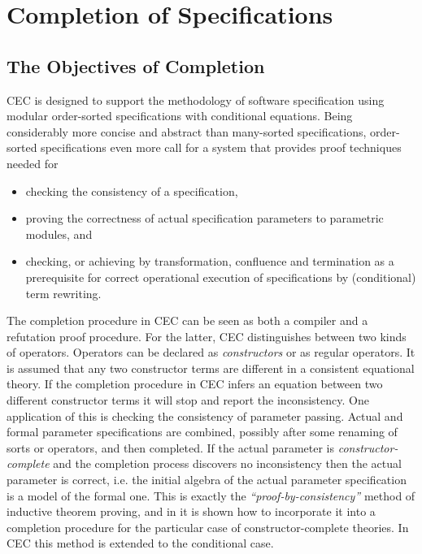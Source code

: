 \section{Completion of Specifications}

\subsection{The Objectives of Completion}

CEC is designed to support the methodology of software specification 
using modular order-sorted specifications with conditional equations.
Being considerably more concise and abstract than many-sorted specifications,
order-sorted specifications even more call for a system that provides
proof techniques needed for
\begin{itemize}
\item checking the consistency of a specification,
\item proving the correctness of actual specification parameters to
parametric modules, and
\item checking, or achieving by transformation, confluence and termination
as a prerequisite
for correct operational execution of specifications by (conditional)
term rewriting.
\end{itemize}
The completion procedure in CEC can be seen as both a compiler and a refutation
proof procedure.
For the latter, CEC distinguishes between two kinds of operators.
Operators can be declared
as {\em constructors} or as regular operators.
It is assumed that any two constructor terms
are different in a consistent equational theory.
If the completion procedure in CEC infers an equation between two
different constructor terms it will stop and report the inconsistency.
One application of this is checking the consistency of parameter passing.
Actual and formal parameter specifications are combined, possibly after
some renaming of sorts or operators, and then completed.
If the actual parameter is {\em constructor-complete} and the completion
process 
discovers no inconsistency then the actual parameter is correct, i.e.
the initial algebra of the actual parameter specification is a model of the
formal one.
This is exactly the {\em ``proof-by-consistency''} method of inductive theorem
proving, and in \cite{HH80} it is shown how to incorporate it into
a completion procedure for the particular case of constructor-complete
theories. In CEC this method is extended to the conditional case.


